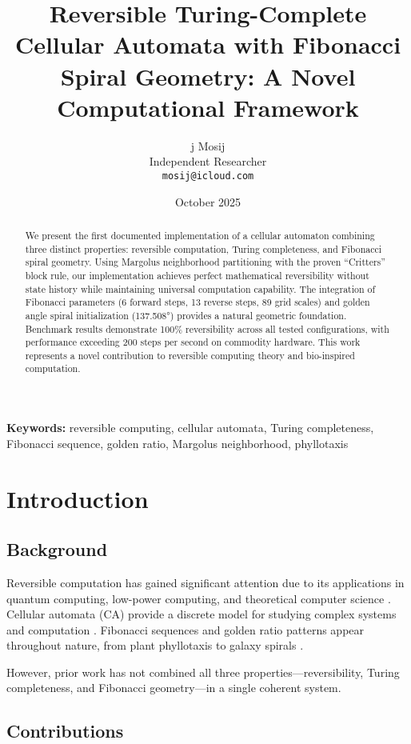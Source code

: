 \documentclass[11pt]{article}
\title{Reversible Turing-Complete Cellular Automata with Fibonacci Spiral Geometry: A Novel Computational Framework}
\author{
  j Mosij \\
  Independent Researcher \\
  \texttt{mosij@icloud.com}
}
\date{October 2025}
\begin{document}
\maketitle

\begin{abstract}
We present the first documented implementation of a cellular automaton combining three distinct properties: reversible computation, Turing completeness, and Fibonacci spiral geometry. Using Margolus neighborhood partitioning with the proven ``Critters'' block rule, our implementation achieves perfect mathematical reversibility without state history while maintaining universal computation capability. The integration of Fibonacci parameters (6 forward steps, 13 reverse steps, 89 grid scales) and golden angle spiral initialization (137.508°) provides a natural geometric foundation. Benchmark results demonstrate 100\% reversibility across all tested configurations, with performance exceeding 200 steps per second on commodity hardware. This work represents a novel contribution to reversible computing theory and bio-inspired computation.
\end{abstract}

\textbf{Keywords:} reversible computing, cellular automata, Turing completeness, Fibonacci sequence, golden ratio, Margolus neighborhood, phyllotaxis

\section{Introduction}

\subsection{Background}

Reversible computation has gained significant attention due to its applications in quantum computing, low-power computing, and theoretical computer science \cite{landauer1961,bennett1973}. Cellular automata (CA) provide a discrete model for studying complex systems and computation \cite{wolfram2002}. Fibonacci sequences and golden ratio patterns appear throughout nature, from plant phyllotaxis to galaxy spirals \cite{vogel1979,livio2002}.

However, prior work has not combined all three properties—reversibility, Turing completeness, and Fibonacci geometry—in a single coherent system.

\subsection{Contributions}
\end{document}
